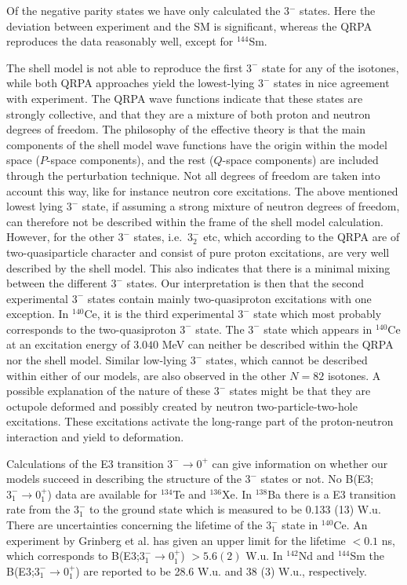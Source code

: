 Of the negative parity states we have only calculated the 3$^{-}$ states. 
Here the deviation between experiment and the SM 
is significant, whereas the QRPA
reproduces the data reasonably well, except for $^{144}$Sm. 

The shell model is not able to reproduce the first $3^{-}$ state for any
of the isotones, while both QRPA approaches yield the lowest-lying $3^{-}$
states in nice agreement with experiment. The QRPA wave functions 
indicate that
these states are strongly collective, and that they are a mixture of both 
proton and 
neutron degrees of freedom. 
The philosophy of the effective theory is 
that the main components of the shell 
model wave functions have the origin  
within the model space ($P$-space components), 
and the rest ($Q$-space components) are included 
through the perturbation technique.
Not all degrees of freedom are taken into account this way, like for instance 
neutron core excitations. The above mentioned lowest lying 
$3^{-}$ state, 
if assuming a strong mixture 
of neutron degrees of freedom, 
can therefore not be described within the frame of 
the shell model calculation. 
However, for the other $3^{-}$ states, i.e.\ $3^{-}_2$ etc, 
which according to the 
QRPA are of two-quasiparticle character and consist of pure
proton excitations, are very well described by the shell model. 
This also indicates
that there is a minimal mixing between the different $3^{-}$ states. Our 
interpretation is then that the second experimental $3^{-}$ states contain
mainly two-quasiproton excitations with one exception. In $^{140}$Ce, 
it is the third experimental $3^{-}$ state which most probably corresponds to 
the two-quasiproton $3^{-}$ state. The $3^{-}$ state which appears in 
$^{140}$Ce at an excitation energy of $3.040$ MeV can neither be described 
within the QRPA nor the shell model. Similar low-lying $3^{-}$ states, which
cannot be described within either of our models, are also observed in the 
other $N=82$ isotones. A possible explanation of the nature of these $3^{-}$ 
states might be that they are octupole deformed and possibly created by neutron
two-particle-two-hole excitations. These excitations activate the 
long-range part of the proton-neutron interaction and yield to deformation.

Calculations of the E3 transition $3^{-} \rightarrow 0^{+}$ can give 
information on whether our models succeed in describing the structure of the 
$3^{-}$ states or not. No B(E3;$3^{-}_{1} \rightarrow 0^{+}_{1}$) data are 
available for $^{134}$Te and $^{136}$Xe. In $^{138}$Ba there is a E3 
transition rate 
from the $3^{-}_{1}$ to the ground state which is measured to be 0.133 (13) 
W.u. There are uncertainties concerning the lifetime of the $3^{-}_{1}$ state
in $^{140}$Ce. An experiment by Grinberg et al. \cite{g93:E3} has 
given an upper limit for the lifetime $< 0.1$ ns, which 
corresponds to B(E3;$3^{-}_{1} \rightarrow 0^{+}_{1}$) $> 5.6 (2)$ W.u. In
$^{142}$Nd and $^{144}$Sm the B(E3;$3^{-}_{1} \rightarrow 0^{+}_{1}$) are
reported to be 28.6 W.u. and 38 (3) W.u., respectively.

